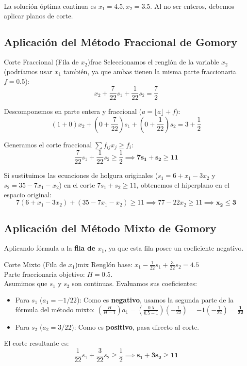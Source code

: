 \documentclass[10pt,a4paper]{article}
\begin{document}
La solución óptima continua es $x_1 = 4.5, x_2 = 3.5$. Al no ser enteros, debemos aplicar planos de corte.


\subsection{Aplicación del Método Fraccional de Gomory}

\begin{mytheo}{Corte Fraccional (Fila de $x_2$)}{frac}
Seleccionamos el renglón de la variable $x_2$ (podríamos usar $x_1$ también, ya que ambas tienen la misma parte fraccionaria $f = 0.5$):
\[ x_2 + \frac{7}{22}s_1 + \frac{1}{22}s_2 = \frac{7}{2} \]

Descomponemos en parte entera y fraccional ($a = \lfloor a \rfloor + f$):
\[ (1+0)x_2 + \left(0 + \frac{7}{22}\right)s_1 + \left(0 + \frac{1}{22}\right)s_2 = 3 + \frac{1}{2} \]

Generamos el corte fraccional $\sum f_{ij}x_j \geq f_i$:
\[ \frac{7}{22}s_1 + \frac{1}{22}s_2 \geq \frac{1}{2} \implies \mathbf{7s_1 + s_2 \geq 11} \]
\end{mytheo}

\begin{nota}{}
Si sustituimos las ecuaciones de holgura originales ($s_1 = 6 + x_1 - 3x_2$ y $s_2 = 35 - 7x_1 - x_2$) en el corte $7s_1 + s_2 \geq 11$, obtenemos el hiperplano en el espacio original:
\[ 7(6 + x_1 - 3x_2) + (35 - 7x_1 - x_2) \geq 11 \implies 77 - 22x_2 \geq 11 \implies \mathbf{x_2 \leq 3} \]
\end{nota}


\subsection{Aplicación del Método Mixto de Gomory}

Aplicando fórmula a la \textbf{fila de $x_1$}, ya que esta fila posee un coeficiente negativo.

\begin{mytheo}{Corte Mixto (Fila de $x_1$)}{mix}
Renglón base: $x_1 - \frac{1}{22}s_1 + \frac{3}{22}s_2 = 4.5$ \\
Parte fraccionaria objetivo: $H = 0.5$. \\
Asumimos que $s_1$ y $s_2$ son continuas. Evaluamos sus coeficientes:
\begin{itemize}
    \item Para $s_1$ ($a_1 = -1/22$): Como es \textbf{negativo}, usamos la segunda parte de la fórmula del método mixto: $\left(\frac{H}{H-1}\right) a_1 = \left(\frac{0.5}{0.5-1}\right) \left(-\frac{1}{22}\right) = -1 \left(-\frac{1}{22}\right) = \mathbf{\frac{1}{22}}$
    \item Para $s_2$ ($a_2 = 3/22$): Como es \textbf{positivo}, pasa directo al corte.
\end{itemize}

El corte resultante es:
\[ \frac{1}{22}s_1 + \frac{3}{22}s_2 \geq \frac{1}{2} \implies \mathbf{s_1 + 3s_2 \geq 11} \]

\end{mytheo}
\end{document}

